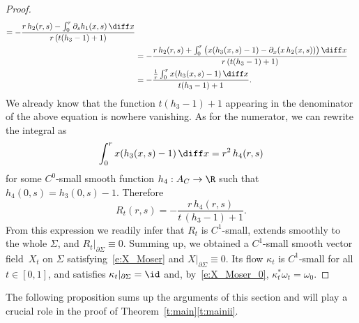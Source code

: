 \begin{proof}
\begin{align*}
=
-\frac {r\, h_2(r,s) -\int_0^r \partial_s h_1(x,s)\,\diff x}{r\,(t(h_3-1)+1)}\\
&=
-\frac {r\, h_2(r,s) +\int_0^r \big(x (h_3(x,s) - 1) - \partial_x(x\, h_2(x,s))\big)\,\diff x}{r\,(t(h_3-1)+1)}\\
&=
-\frac {\tfrac1r\int_0^r x (h_3(x,s) - 1) \,\diff x}{t(h_3-1)+1}.
\end{align*}
We already know that the function $t(h_3-1)+1$ appearing in the denominator of the above equation is nowhere vanishing. As for the numerator, we can rewrite the integral as
\[
\int_0^r x (h_3(x,s) - 1) \,\diff x = r^2\, h_4(r,s)
\]
for some $C^0$-small smooth function $h_4:A_C\to\R$ such that $h_4(0,s)=h_3(0,s) - 1$. Therefore
\[
R_t(r,s) = -\frac {r\,h_4(r,s)}{t\,(h_3-1)+1}.
\]
From this expression we readily infer that $R_t$ is $C^1$-small, extends smoothly to the whole $\Sigma$, and $R_t|_{\partial\Sigma}\equiv0$. Summing up, we obtained a $C^1$-small smooth vector field~$X_t$ on $\Sigma$ satisfying~\eqref{e:X_Moser} and $X|_{\partial\Sigma}\equiv0$.
Its flow $\kappa_t$ is $C^1$-small for all $t\in[0,1]$, and satisfies $\kappa_t|_{\partial\Sigma}=\id$ and, by~\eqref{e:X_Moser_0}, $\kappa_t^*\omega_t=\omega_0$.
\end{proof}

The following proposition sums up the arguments of this section and will play a crucial role in the proof of Theorem~\ref{t:main}\eqref{t:mainii}.

